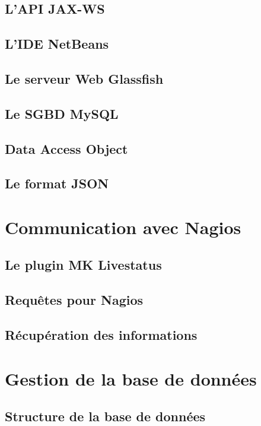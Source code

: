 \subsection{L'API JAX-WS}

\subsection{L'IDE NetBeans}

\subsection{Le serveur Web Glassfish}

\subsection{Le SGBD MySQL}

\subsection{Data Access Object}

\subsection{Le format JSON}

\section{Communication avec Nagios}

\subsection{Le plugin MK Livestatus}

\subsection{Requ\^etes pour Nagios}

\subsection{R\'ecup\'eration des informations}

\section{Gestion de la base de donn\'ees}

\subsection{Structure de la base de donn\'ees}

